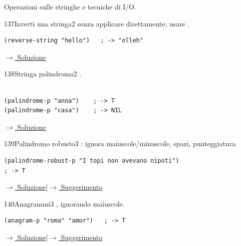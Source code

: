 \noindent
Operazioni sulle stringhe e tecniche di I/O.

\bigskip

\label{ex:137}
\begin{stdbox}{137}{Inverti una stringa}{2}
  senza applicare 
direttamente; usare .
\begin{lstlisting}
(reverse-string "hello")   ; -> "olleh"
\end{lstlisting}


\small\color{black!55}\hyperref[sol:137]{$\rightarrow$ Soluzione}\normalsize\color{black}
\end{stdbox}

\label{ex:138}
\begin{stdbox}{138}{Stringa palindroma}{2}
 .\\\\
\nopagebreak
\begin{lstlisting}
(palindrome-p "anna")    ; -> T
(palindrome-p "casa")    ; -> NIL
\end{lstlisting}


\small\color{black!55}\hyperref[sol:138]{$\rightarrow$ Soluzione}\normalsize\color{black}
\end{stdbox}

\label{ex:139}
\begin{colbox}{139}{Palindromo robusto}{3}
 : ignora
maiuscole/minuscole, spazi, punteggiatura.
\begin{lstlisting}
(palindrome-robust-p "I topi non avevano nipoti")
; -> T
\end{lstlisting}


\small\color{black!55}\hyperref[sol:139]{$\rightarrow$ Soluzione}\enspace\textcolor{black!30}{|}\enspace\hyperref[hint:139]{$\rightarrow$ Suggerimento}\normalsize\color{black}
\end{colbox}

\label{ex:140}
\begin{stdbox}{140}{Anagrammi}{3}
 , ignorando maiuscole.
\nopagebreak
\begin{lstlisting}
(anagram-p "roma" "amor")   ; -> T
\end{lstlisting}


\small\color{black!55}\hyperref[sol:140]{$\rightarrow$ Soluzione}\enspace\textcolor{black!30}{|}\enspace\hyperref[hint:140]{$\rightarrow$ Suggerimento}\normalsize\color{black}
\end{stdbox}

